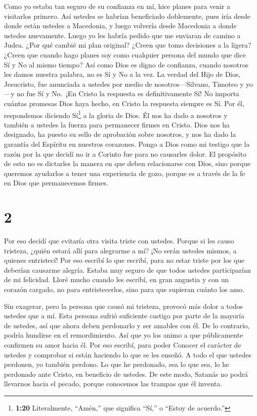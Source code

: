  Como yo estaba tan seguro de su confianza en mí, hice
planes para venir a visitarlos primero. Así ustedes se habrían
beneficiado doblemente,  pues iría desde donde están
ustedes a Macedonia, y luego volvería desde Macedonia a donde ustedes
nuevamente. Luego yo les habría pedido que me enviaran de camino a
Judea.  ¿Por qué cambié mi plan original? ¿Creen que tomo
decisiones a la ligera? ¿Creen que cuando hago planes soy como cualquier
persona del mundo que dice Sí y No al mismo tiempo?  Así
como Dios es digno de confianza, cuando nosotros les damos nuestra
palabra, no es Sí y No a la vez.  La verdad del Hijo de
Dios, Jesucristo, fue anunciada a ustedes por medio de
nosotros---Silvano, Timoteo y yo---y no fue Sí y No.~¡En Cristo la
respuesta es definitivamente Sí!  No importa cuántas
promesas Dios haya hecho, en Cristo la respuesta siempre es Sí. Por él,
respondemos diciendo Sí\footnote{\textbf{1:20} Literalmente, ``Amén,''
  que significa ``Sí,'' o ``Estoy de acuerdo.''} a la gloria de Dios.
 Él nos ha dado a nosotros y también a ustedes la fuerza
para permanecer firmes en Cristo. Dios nos ha designado, 
ha puesto su sello de aprobación sobre nosotros, y nos ha dado la
garantía del Espíritu en nuestros corazones.  Pongo a Dios
como mi testigo que la razón por la que decidí no ir a Corinto fue para
no causarles dolor.  El propósito de esto no es dictarles
la manera en que deben relacionarse con Dios, sino porque queremos
ayudarlos a tener una experiencia de gozo, porque es a través de la fe
en Dios que permanecemos firmes.

\hypertarget{section-1}{%
\section{2}\label{section-1}}

 Por eso decidí que evitaría otra visita triste con ustedes.
 Porque si les causo tristeza, ¿quién estará allí para
alegrarme a mí? ¡No serán ustedes mismos, a quienes entristecí!
 Por eso escribí lo que escribí, para no estar triste por
los que deberían causarme alegría. Estaba muy seguro de que todos
ustedes participarían de mi felicidad.  Lloré mucho cuando
les escribí, en gran angustia y con un corazón cargado, no para
entristecerlos, sino para que supieran cuánto los amo.

 Sin exagerar, pero la persona que causó mi tristeza,
provocó más dolor a todos ustedes que a mí.  Esta persona
sufrió suficiente castigo por parte de la mayoría de ustedes,
 así que ahora deben perdonarlo y ser amables con él. De lo
contrario, podría hundirse en el remordimiento.  Así que yo
los animo a que públicamente confirmen su amor hacia él. 
Por eso escribí, para poder Conocer el carácter de ustedes y comprobar
si están haciendo lo que se les enseñó.  A todo el que
ustedes perdonen, yo también perdono. Lo que he perdonado, sea lo que
sea, lo he perdonado ante Cristo, en beneficio de ustedes. 
De este modo, Satanás no podrá llevarnos hacia el pecado, porque
conocemos las trampas que él inventa.

